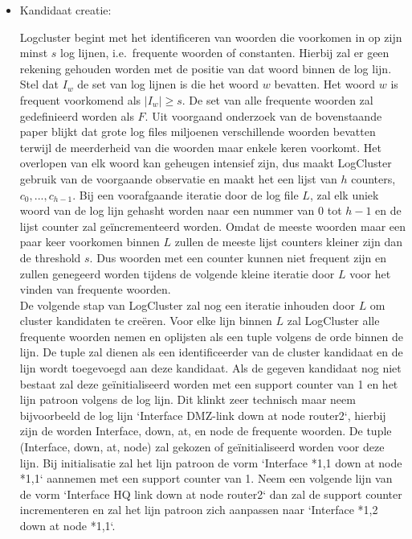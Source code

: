 \begin{itemize}
    \item Kandidaat creatie: 
    
    \subitem Logcluster begint met het identificeren van woorden die voorkomen in op zijn minst $s$ log lijnen, i.e.\ frequente woorden of constanten. Hierbij zal er geen rekening gehouden worden met de positie van dat woord binnen de log lijn. Stel dat \(I_{w}\) de set van log lijnen is die het woord $w$ bevatten. Het woord $w$ is frequent voorkomend als \(\lvert I_{w} \rvert \geq s\). De set van alle frequente woorden zal gedefinieerd worden als $F$. Uit voorgaand onderzoek van de bovenstaande paper blijkt dat grote log files miljoenen verschillende woorden bevatten terwijl de meerderheid van die woorden maar enkele keren voorkomt. Het overlopen van elk woord kan geheugen intensief zijn, dus maakt LogCluster gebruik van de voorgaande observatie en maakt het een lijst van $h$ counters, \(c_{0}, ..., c_{h - 1}\). Bij een voorafgaande iteratie door de log file $L$, zal elk uniek woord van de log lijn gehasht worden naar een nummer van 0 tot $h-1$ en de lijst counter zal geïncrementeerd worden. Omdat de meeste woorden maar een paar keer voorkomen binnen $L$ zullen de meeste lijst counters kleiner zijn dan de threshold $s$. Dus woorden met een counter kunnen niet frequent zijn en zullen genegeerd worden tijdens de volgende kleine iteratie door $L$ voor het vinden van frequente woorden.\\
    
    \subitem De volgende stap van LogCluster zal nog een iteratie inhouden door $L$ om cluster kandidaten te creëren. Voor elke lijn binnen $L$ zal LogCluster alle frequente woorden nemen en oplijsten als een tuple volgens de orde binnen de lijn. De tuple zal dienen als een identificeerder van de cluster kandidaat en de lijn wordt toegevoegd aan deze kandidaat. Als de gegeven kandidaat nog niet bestaat zal deze geïnitialiseerd worden met een support counter van 1 en het lijn patroon volgens de log lijn. Dit klinkt zeer technisch maar neem bijvoorbeeld de log lijn `Interface DMZ-link
    down at node router2`, hierbij zijn de worden Interface, down, at, en node de frequente woorden. De tuple (Interface, down, at, node) zal gekozen of geïnitialiseerd worden voor deze lijn. Bij initialisatie zal het lijn patroon de vorm `Interface *{1,1} down at node *{1,1}` aannemen met een support counter van 1. Neem een volgende lijn van de vorm `Interface HQ
    link down at node router2` dan zal de support counter incrementeren en zal het lijn patroon zich aanpassen naar `Interface *{1,2} down at node *{1,1}`.\\
    

\end{itemize}
